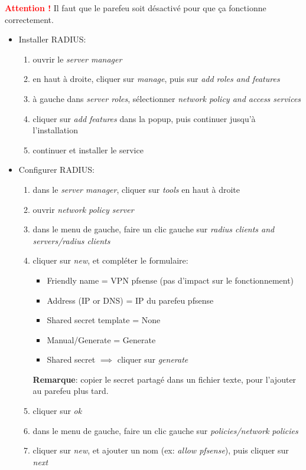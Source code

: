 \documentclass[a4paper]{article}
\begin{document}
\textcolor{red}{\textbf{Attention !}} Il faut que le parefeu soit désactivé pour que ça fonctionne correctement.
\begin{itemize}
    \item Installer RADIUS:
    \begin{enumerate}
        \item ouvrir le \textit{server manager}
        \item en haut à droite, cliquer sur \textit{manage}, puis sur \textit{add roles and features}
        \item à gauche dans \textit{server roles}, sélectionner \textit{network policy and access services}
        \item cliquer sur \textit{add features} dans la popup, puis continuer jusqu'à l'installation
        \item continuer et installer le service
    \end{enumerate}
    \item Configurer RADIUS:
    \begin{enumerate}
        \item dans le \textit{server manager}, cliquer sur \textit{tools} en haut à droite
        \item ouvrir \textit{network policy server}
        \item dans le menu de gauche, faire un clic gauche sur \textit{radius clients and servers/radius clients}
        \item cliquer sur \textit{new}, et compléter le formulaire:
        \begin{itemize}
            \item Friendly name = VPN pfsense (pas d'impact sur le fonctionnement)
            \item Address (IP or DNS) = IP du parefeu pfsense
            \item Shared secret template = None
            \item Manual/Generate = Generate
            \item Shared secret $\implies$ cliquer sur \textit{generate}
        \end{itemize}
        \textbf{Remarque}: copier le secret partagé dans un fichier texte, pour l'ajouter au parefeu plus tard.
        \item cliquer sur \textit{ok}
        \item dans le menu de gauche, faire un clic gauche sur \textit{policies/network policies}
        \item cliquer sur \textit{new}, et ajouter un nom (ex: \textit{allow pfsense}), puis cliquer sur \textit{next}

\end{enumerate}
\end{itemize}
\end{document}
